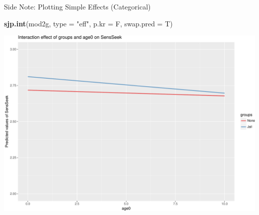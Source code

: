 \documentclass[ignorenonframetext,]{beamer}
\newenvironment{Shaded}{\begin{snugshade}}{\end{snugshade}}
\newcommand{\KeywordTok}[1]{\textcolor[rgb]{0.13,0.29,0.53}{\textbf{{#1}}}}
\newcommand{\DataTypeTok}[1]{\textcolor[rgb]{0.13,0.29,0.53}{{#1}}}
\newcommand{\StringTok}[1]{\textcolor[rgb]{0.31,0.60,0.02}{{#1}}}
\newcommand{\NormalTok}[1]{{#1}}
\begin{document}
\begin{frame}[fragile]{Side Note: Plotting Simple Effects (Categorical)}

\small

\begin{Shaded}
\begin{Highlighting}[]
\KeywordTok{sjp.int}\NormalTok{(mod2g, }\DataTypeTok{type =} \StringTok{"eff"}\NormalTok{, }\DataTypeTok{p.kr =} \NormalTok{F, }\DataTypeTok{swap.pred =} \NormalTok{T)}
\end{Highlighting}
\end{Shaded}

\includegraphics{Conditional_Models_files/figure-beamer/unnamed-chunk-29-1.pdf}

\end{frame}
\end{document}
